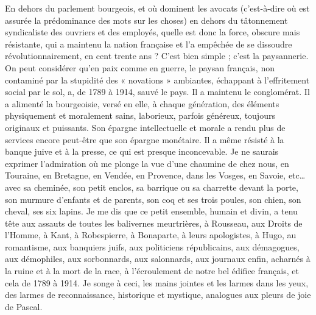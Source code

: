 \documentclass[french,twoside]{book} %
\begin{document}
En dehors du parlement bourgeois, et où dominent les avocats (c’est-à-dire où est assurée la prédominance des mots sur les choses) en dehors du tâtonnement syndicaliste des ouvriers et des employés, quelle est donc la force, obscure mais résistante, qui a maintenu la nation française et l’a empêchée de se dissoudre révolutionnairement, en cent trente ans ? C’est bien simple ; c’est la paysannerie. On peut considérer qu’en paix comme en guerre, le paysan français, non contaminé par la stupidité des « novations » ambiantes, échappant à l’effritement social par le sol, a, de 1789 à 1914, sauvé le pays. Il a maintenu le conglomérat. Il a alimenté la bourgeoisie, versé en elle, à chaque génération, des éléments physiquement et moralement sains, laborieux, parfois généreux, toujours originaux et puissants. Son épargne intellectuelle et morale a rendu plus de services encore peut-être que son épargne monétaire. Il a même résisté à la banque juive et à la presse, ce qui est presque inconcevable. Je ne saurais exprimer l’admiration où me plonge la vue d’une chaumine de chez nous, en Touraine, en Bretagne, en Vendée, en Provence, dans les Vosges, en Savoie, etc… avec sa cheminée, son petit enclos, sa barrique ou sa charrette devant la porte, son murmure d’enfants et de parents, son coq et ses trois poules, son chien, son cheval, ses six lapins. Je me dis que ce petit ensemble, humain et divin, a tenu tête aux assauts de toutes les balivernes meurtrières, à Rousseau, aux Droits de l’Homme, à Kant, à Robespierre, à Bonaparte, à leurs apologistes, à Hugo, au romantisme, aux banquiers juifs, aux politiciens républicains, aux démagogues, aux démophiles, aux sorbonnards, aux salonnards, aux journaux enfin, acharnés à la ruine et à la mort de la race, à l’écroulement de notre bel édifice français, et cela de 1789 à 1914. Je songe à ceci, les mains jointes et les larmes dans les yeux, des larmes de reconnaissance, historique et mystique, analogues aux pleurs de joie de Pascal.\par
\end{document}
